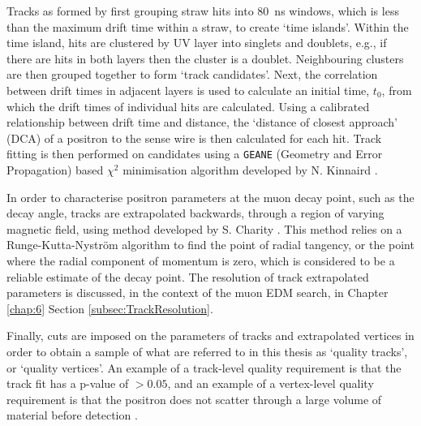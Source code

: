 Tracks as formed by first grouping straw hits into \SI{80}{\nano\second} windows, which is less than the maximum drift time within a straw, to create `time islands'. Within the time island, hits are clustered by UV layer into singlets and doublets, e.g., if there are hits in both layers then the cluster is a doublet. Neighbouring clusters are then grouped together to form `track candidates'. Next, the correlation between drift times in adjacent layers is used to calculate an initial time, $t_{0}$, from which the drift times of individual hits are calculated. Using a calibrated relationship between drift time and distance, the `distance of closest approach' (DCA) of a positron to the sense wire is then calculated for each hit. Track fitting is then performed on candidates using a \texttt{GEANE} (Geometry and Error Propagation) \cite{GEANE} based $\chi^{2}$ minimisation algorithm developed by N. Kinnaird \cite{Kinnaird}. 

In order to characterise positron parameters at the muon decay point, such as the decay angle, tracks are extrapolated backwards, through a region of varying magnetic field, using method developed by S. Charity \cite{Charity}. This method relies on a Runge-Kutta-Nyström algorithm \cite{Runge} to find the point of radial tangency, or the point where the radial component of momentum is zero, which is considered to be a reliable estimate of the decay point. The resolution of track extrapolated parameters is discussed, in the context of the muon EDM search, in Chapter \ref{chap:6} Section \ref{subsec:TrackResolution}.

Finally, cuts are imposed on the parameters of tracks and extrapolated vertices in order to obtain a sample of what are referred to in this thesis as `quality tracks', or `quality vertices'. An example of a track-level quality requirement is that the track fit has a p-value of $>0.05$, and an example of a vertex-level quality requirement is that the positron does not scatter through a large volume of material before detection \cite{TrackQuality}.



